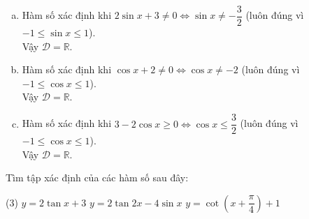 \begin{vd}
{\begin{enumerate}[a)]
		\item Hàm số xác định khi $2\sin x + 3 \ne 0 \Leftrightarrow \sin x \ne -\dfrac{3}{2}$ (luôn đúng vì $-1 \le \sin x \le 1$).\\
		Vậy $\mathscr{D} = \mathbb{R}$.
		
		\item Hàm số xác định khi $\cos x + 2 \ne 0 \Leftrightarrow \cos x \ne -2$ (luôn đúng vì $-1 \le \cos x \le 1$).\\
		Vậy $\mathscr{D} = \mathbb{R}$.
		
		\item Hàm số xác định khi $3 - 2\cos x \ge 0 \Leftrightarrow \cos x \le \dfrac{3}{2}$ (luôn đúng vì $-1 \le \cos x \le 1$).\\
		Vậy $\mathscr{D} = \mathbb{R}$.
	\end{enumerate}
}
\end{vd} 
\begin{vd}
	Tìm tập xác định của các hàm số sau đây:
	\begin{tasks}(3)
		\task $y=2\tan x+3$ 
		\task $y=2\tan 2x-4\sin x$
		\task $y=\cot \left(x+\dfrac{\pi}{4} \right)+1$ 
	\end{tasks}
\end{vd} 


